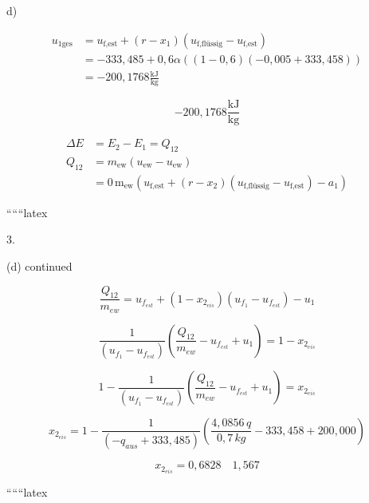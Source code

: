 d)

\begin{align*}
u_{1\text{ges}} &= u_{\text{f,est}} + (r-x_1) (u_{\text{f,flüssig}} - u_{\text{f,est}}) \\
&= -333,485 + 0,6 \alpha \left( (1-0,6) (-0,005 + 333,458) \right) \\
&= -200,1768 \frac{\text{kJ}}{\text{kg}}
\end{align*}

\[
\boxed{-200,1768 \frac{\text{kJ}}{\text{kg}}}
\]

\begin{align*}
\Delta E &= E_2 - E_1 = Q_{12} \\
Q_{12} &= m_{\text{ew}} (u_{\text{ew}} - u_{\text{ew}}) \\
&= 0 \, \text{m}_{\text{ew}} \left( u_{\text{f,est}} + (r-x_2) (u_{\text{f,flüssig}} - u_{\text{f,est}}) - a_1 \right)
\end{align*}

``````latex


3.

(d) continued

\begin{equation*}
\frac{Q_{12}}{m_{ew}} = u_{f_{est}} + (1 - x_{2_{eis}})(u_{f_1} - u_{f_{est}}) - u_1
\end{equation*}

\begin{equation*}
\frac{1}{(u_{f_1} - u_{f_{est}})} \left( \frac{Q_{12}}{m_{ew}} - u_{f_{est}} + u_1 \right) = 1 - x_{2_{eis}}
\end{equation*}

\begin{equation*}
1 - \frac{1}{(u_{f_1} - u_{f_{est}})} \left( \frac{Q_{12}}{m_{ew}} - u_{f_{est}} + u_1 \right) = x_{2_{eis}}
\end{equation*}

\begin{equation*}
x_{2_{eis}} = 1 - \frac{1}{(-q_{aus} + 333,485)} \left( \frac{4,0856 \, q}{0,7 \, kg} - 333,458 + 200,000 \right)
\end{equation*}

\begin{equation*}
x_{2_{eis}} = \boxed{0,6828} \quad \boxed{1,567}
\end{equation*}

``````latex